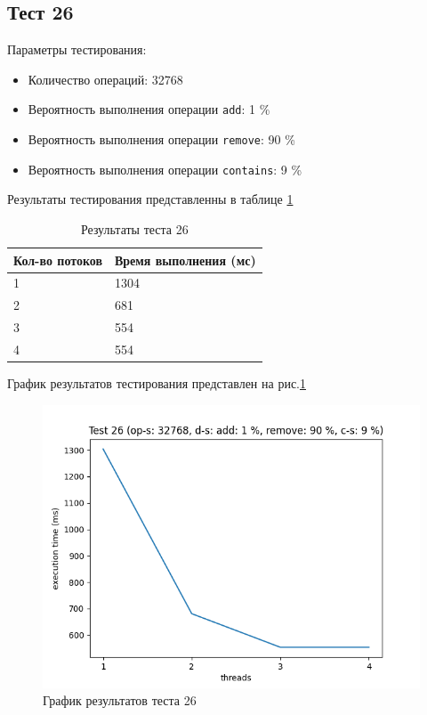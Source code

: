 \subsection*{Тест 26}

Параметры тестирования:

\begin{itemize}
    \item Количество операций: 32768
    \item Вероятность выполнения операции \verb|add|: 1 \%
    \item Вероятность выполнения операции \verb|remove|: 90 \%
    \item Вероятность выполнения операции \verb|contains|: 9 \%
\end{itemize}

Результаты тестирования представленны в таблице \ref{tab:results26}


\begin{table}[H]
    \centering
    \begin{tabular}{|l|l|}
        \hline
        Кол-во потоков & Время выполнения (мс) \\
        \hline
        1 & 1304 \\
        \hline
        2 & 681 \\
        \hline
        3 & 554 \\
        \hline
        4 & 554 \\
        \hline
    \end{tabular}
    \caption{Результаты теста 26}
    \label{tab:results26}
\end{table}
        

График результатов тестирования представлен на рис.\ref{fig:plot26}

\begin{figure}[H]
    \centering
    \includegraphics[width=0.7\linewidth]{photo/plot26}
    \caption{График результатов теста 26}
    \label{fig:plot26}
\end{figure}

